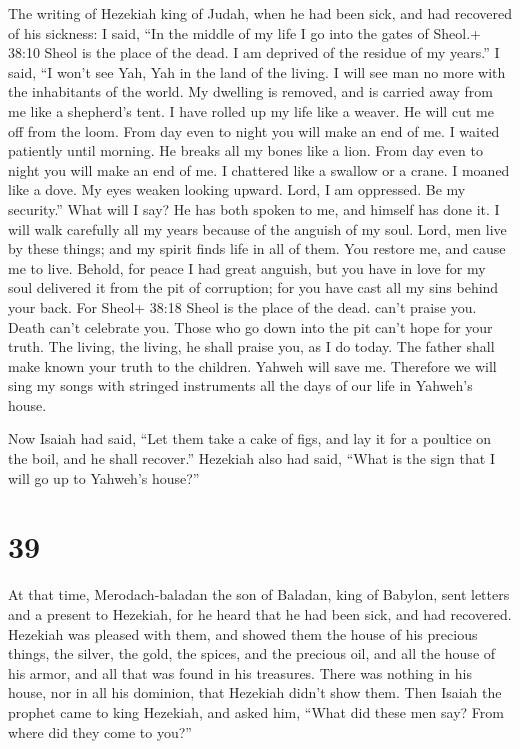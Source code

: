  The writing of Hezekiah king of Judah, when he had been
sick, and had recovered of his sickness:  I said, ``In the
middle of my life I go into the gates of Sheol.+ 38:10 Sheol is the
place of the dead. I am deprived of the residue of my years.''
 I said, ``I won't see Yah, Yah in the land of the living.
I will see man no more with the inhabitants of the world. 
My dwelling is removed, and is carried away from me like a shepherd's
tent. I have rolled up my life like a weaver. He will cut me off from
the loom. From day even to night you will make an end of me.
 I waited patiently until morning. He breaks all my bones
like a lion. From day even to night you will make an end of me.
 I chattered like a swallow or a crane. I moaned like a
dove. My eyes weaken looking upward. Lord, I am oppressed. Be my
security.''  What will I say? He has both spoken to me, and
himself has done it. I will walk carefully all my years because of the
anguish of my soul.  Lord, men live by these things; and my
spirit finds life in all of them. You restore me, and cause me to live.
 Behold, for peace I had great anguish, but you have in
love for my soul delivered it from the pit of corruption; for you have
cast all my sins behind your back.  For Sheol+ 38:18 Sheol
is the place of the dead. can't praise you. Death can't celebrate you.
Those who go down into the pit can't hope for your truth. 
The living, the living, he shall praise you, as I do today. The father
shall make known your truth to the children.  Yahweh will
save me. Therefore we will sing my songs with stringed instruments all
the days of our life in Yahweh's house.

 Now Isaiah had said, ``Let them take a cake of figs, and
lay it for a poultice on the boil, and he shall recover.'' 
Hezekiah also had said, ``What is the sign that I will go up to Yahweh's
house?''

\hypertarget{section-37}{%
\section{39}\label{section-37}}

 At that time, Merodach-baladan the son of Baladan, king of
Babylon, sent letters and a present to Hezekiah, for he heard that he
had been sick, and had recovered.  Hezekiah was pleased with
them, and showed them the house of his precious things, the silver, the
gold, the spices, and the precious oil, and all the house of his armor,
and all that was found in his treasures. There was nothing in his house,
nor in all his dominion, that Hezekiah didn't show them. 
Then Isaiah the prophet came to king Hezekiah, and asked him, ``What did
these men say? From where did they come to you?''

